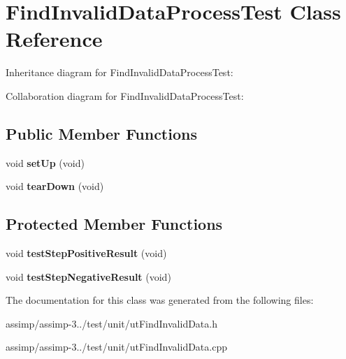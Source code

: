 \hypertarget{class_find_invalid_data_process_test}{\section{Find\+Invalid\+Data\+Process\+Test Class Reference}
\label{class_find_invalid_data_process_test}
}


Inheritance diagram for Find\+Invalid\+Data\+Process\+Test\+:


Collaboration diagram for Find\+Invalid\+Data\+Process\+Test\+:
\subsection*{Public Member Functions}
\begin{DoxyCompactItemize}
\item 
\hypertarget{class_find_invalid_data_process_test_a1035bea1339e6e5cb57c9c3bb9eecf9a}{void {\bfseries set\+Up} (void)}\label{class_find_invalid_data_process_test_a1035bea1339e6e5cb57c9c3bb9eecf9a}

\item 
\hypertarget{class_find_invalid_data_process_test_a9be707b29c3eb8c201151d9589e2d7a5}{void {\bfseries tear\+Down} (void)}\label{class_find_invalid_data_process_test_a9be707b29c3eb8c201151d9589e2d7a5}

\end{DoxyCompactItemize}
\subsection*{Protected Member Functions}
\begin{DoxyCompactItemize}
\item 
\hypertarget{class_find_invalid_data_process_test_a5898be2d7a05aaf7f88e9334f3116fb8}{void {\bfseries test\+Step\+Positive\+Result} (void)}\label{class_find_invalid_data_process_test_a5898be2d7a05aaf7f88e9334f3116fb8}

\item 
\hypertarget{class_find_invalid_data_process_test_a570a97a11d31409bcb5fbc1748361667}{void {\bfseries test\+Step\+Negative\+Result} (void)}\label{class_find_invalid_data_process_test_a570a97a11d31409bcb5fbc1748361667}

\end{DoxyCompactItemize}


The documentation for this class was generated from the following files\+:\begin{DoxyCompactItemize}
\item 
assimp/assimp-\/3../test/unit/ut\+Find\+Invalid\+Data.\+h\item 
assimp/assimp-\/3../test/unit/ut\+Find\+Invalid\+Data.\+cpp\end{DoxyCompactItemize}
